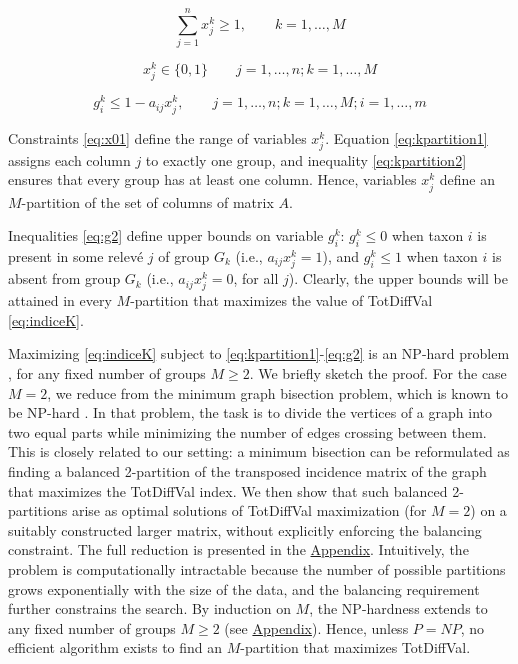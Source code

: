 \begin{equation}
\sum_{j=1}^n x_j^k\geq 1, \quad \quad k=1,\dots,M
\label{eq:kpartition2}
\end{equation}

\begin{equation}
x_j^k\in \{0,1\} \quad \quad j=1,\dots,n; k=1,\dots,M
\label{eq:x01}
\end{equation}

\begin{equation}
g_i^k\leq 1 - a_{ij}x_j^k, \quad \quad j=1,\dots,n; k=1,\dots,M; i=1,\dots,m
\label{eq:g2}
\end{equation}

Constraints \eqref{eq:x01} define the range of variables \(x_j^k\). Equation \eqref{eq:kpartition1} assigns each column \(j\) to exactly one group, and inequality \eqref{eq:kpartition2} ensures that every group has at least one column. Hence, variables \(x_j^k\) define an \(M\)-partition of the set of columns of matrix \(A\).

Inequalities \eqref{eq:g2} define upper bounds on variable \(g_i^k\): \(g_i^k\leq 0\) when taxon \(i\) is present in some relevé \(j\) of group \(G_k\) (i.e., \(a_{ij}x_j^k=1\)), and \(g_i^k\leq 1\) when taxon \(i\) is absent from group \(G_k\) (i.e., \(a_{ij}x_j^k=0\), for all \(j\)). Clearly, the upper bounds will be attained in every \(M\)-partition that maximizes the value of TotDiffVal \eqref{eq:indiceK}.

Maximizing \eqref{eq:indiceK} subject to \eqref{eq:kpartition1}-\eqref{eq:g2} is an NP-hard problem \citep{GJ1979}, for any fixed number of groups \(M\geq 2\). We briefly sketch the proof. For the case \(M=2\), we reduce from the minimum graph bisection problem, which is known to be NP-hard \citep{GJS1976}. In that problem, the task is to divide the vertices of a graph into two equal parts while minimizing the number of edges crossing between them. This is closely related to our setting: a minimum bisection can be reformulated as finding a balanced 2-partition of the transposed incidence matrix of the graph that maximizes the TotDiffVal index. We then show that such balanced 2-partitions arise as optimal solutions of TotDiffVal maximization (for \(M=2\)) on a suitably constructed larger matrix, without explicitly enforcing the balancing constraint. The full reduction is presented in the \hyperref[appendix]{Appendix}. Intuitively, the problem is computationally intractable because the number of possible partitions grows exponentially with the size of the data, and the balancing requirement further constrains the search. By induction on \(M\), the NP-hardness extends to any fixed number of groups \(M\geq 2\) (see \hyperref[appendix]{Appendix}). Hence, unless \(P=NP\), no efficient algorithm exists to find an \(M\)-partition that maximizes TotDiffVal.

